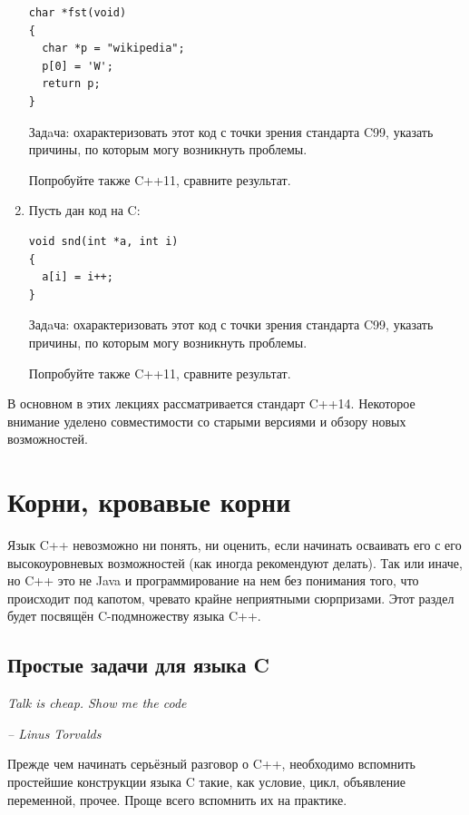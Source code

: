 \documentclass[a4paper,12pt,oneside]{article}
\begin{document}
\begin{enumerate}
\begin{lstlisting}
char *fst(void)
{
  char *p = "wikipedia";
  p[0] = 'W';
  return p;
}
\end{lstlisting}

Задaча: охарактеризовать этот код с точки зрения стандарта C99, указать причины, по которым могу возникнуть проблемы.

Попробуйте также C++11, сравните результат.

\item
Пусть дан код на C:

\begin{lstlisting}
void snd(int *a, int i)
{
  a[i] = i++;
}
\end{lstlisting}

Задaча: охарактеризовать этот код с точки зрения стандарта C99, указать причины, по которым могу возникнуть проблемы.

Попробуйте также C++11, сравните результат.

\end{enumerate}

В основном в этих лекциях рассматривается стандарт C++14. Некоторое внимание уделено совместимости со старыми версиями и обзору новых возможностей.

\pagebreak
\section{Корни, кровавые корни}\label{BloodyRoots}

Язык C++ невозможно ни понять, ни оценить, если начинать осваивать его с его высокоуровневых возможностей (как иногда рекомендуют делать). Так или иначе, но C++ это не Java и программирование на нем без понимания того, что происходит под капотом, чревато крайне неприятными сюрпризами. Этот раздел будет посвящён C-подмножеству языка C++.

\subsection{Простые задачи для языка C}\label{PrimeTasks}

\hfill\textit{Talk is cheap. Show me the code}{\vspace{0.5em}}

\hfill\textit{-- Linus Torvalds}

Прежде чем начинать серьёзный разговор о C++, необходимо вспомнить простейшие конструкции языка C такие, как условие, цикл, объявление переменной, прочее. Проще всего вспомнить их на практике.
\end{document}
